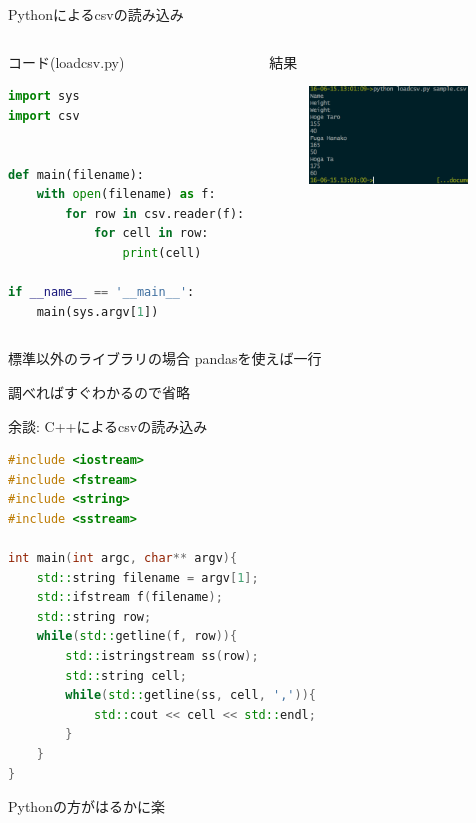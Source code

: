 \documentclass[12pt, dvipdfmx]{beamer}
\begin{document}
\begin{frame}[fragile]{Pythonによるcsvの読み込み}
    \begin{columns}[t]
        \begin{column}{0.5\textwidth}
            \begin{block}{コード(loadcsv.py)}
\begin{lstlisting}[language=Python,basicstyle=\tiny\ttfamily,keywordstyle=\color{blue}\ttfamily, stringstyle=\color{red}]
import sys
import csv


def main(filename):
    with open(filename) as f:
        for row in csv.reader(f):
            for cell in row:
                print(cell)

if __name__ == '__main__':
    main(sys.argv[1])
\end{lstlisting}
            \end{block}
        \end{column}
        \begin{column}{0.5\textwidth}
            \begin{block}{結果}
                \begin{figure}[h]
                    \centering
                    \includegraphics[width=4.2cm]{img/load_csv_result.png}
                \end{figure}
            \end{block}
        \end{column}
    \end{columns}
\end{frame}
\begin{frame}{標準以外のライブラリの場合}
    pandasを使えば一行

    調べればすぐわかるので省略
\end{frame}
\begin{frame}[fragile]{余談: C++によるcsvの読み込み}
\begin{lstlisting}[language=C++,basicstyle=\tiny\ttfamily,keywordstyle=\color{blue}\ttfamily, stringstyle=\color{red}]
#include <iostream>
#include <fstream>
#include <string>
#include <sstream>

int main(int argc, char** argv){
    std::string filename = argv[1];
    std::ifstream f(filename);
    std::string row;
    while(std::getline(f, row)){
        std::istringstream ss(row);
        std::string cell;
        while(std::getline(ss, cell, ',')){
            std::cout << cell << std::endl;
        }
    }
}
\end{lstlisting}

    \pause
    \alert{Pythonの方がはるかに楽}
\end{frame}
\end{document}
